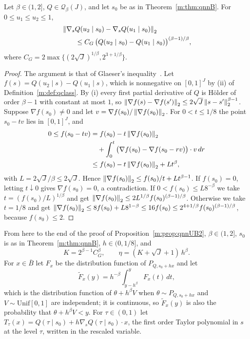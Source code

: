 \begin{lemma}\label{m:lem:glaeser}
Let $\beta\in(1,2]$, $Q\in\mathcal Q_\beta(J)$, and let $s_0$ be as in Theorem~\ref{m:thm:qnnB}. For $0\le u_1\le u_2\le1$,
\[
\begin{aligned}
&\left\|\nabla_sQ(u_2\mid s_0)-\nabla_sQ(u_1\mid s_0)\right\|_2\\
&\qquad\le C_G\,\big(Q(u_2\mid s_0)-Q(u_1\mid s_0)\big)^{(\beta-1)/\beta},
\end{aligned}
\]
where $C_G=2\max\{(2\sqrt J)^{1/\beta},2^{3+1/\beta}\}$.
\end{lemma}

\begin{proof}
The argument is that of Glaeser's inequality~\cite{glaeser1963}. Let $f(s)=Q(u_2\mid s)-Q(u_1\mid s)$, which is nonnegative on $[0,1]^J$ by (ii) of Definition~\ref{m:def:qclass}. By (i) every first partial derivative of $Q$ is H\"older of order $\beta-1$ with constant at most $1$, so $\left\|\nabla f(s)-\nabla f(s')\right\|_2\le2\sqrt J\left\|s-s'\right\|_2^{\beta-1}$. Suppose $\nabla f(s_0)\ne0$ and let $v=\nabla f(s_0)/\left\|\nabla f(s_0)\right\|_2$. For $0<t\le1/8$ the point $s_0-tv$ lies in $[0,1]^J$, and
\[
\begin{aligned}
0\le f(s_0-tv)&=f(s_0)-t\left\|\nabla f(s_0)\right\|_2\\
&\quad+\int_0^t\big(\nabla f(s_0)-\nabla f(s_0-rv)\big)\cdot v\,dr\\
&\le f(s_0)-t\left\|\nabla f(s_0)\right\|_2+Lt^\beta,
\end{aligned}
\]
with $L=2\sqrt J/\beta\le2\sqrt J$. Hence $\left\|\nabla f(s_0)\right\|_2\le f(s_0)/t+Lt^{\beta-1}$. If $f(s_0)=0$, letting $t\downarrow0$ gives $\nabla f(s_0)=0$, a contradiction. If $0<f(s_0)\le L8^{-\beta}$ we take $t=(f(s_0)/L)^{1/\beta}$ and get $\left\|\nabla f(s_0)\right\|_2\le2L^{1/\beta}f(s_0)^{(\beta-1)/\beta}$. Otherwise we take $t=1/8$ and get $\left\|\nabla f(s_0)\right\|_2\le8f(s_0)+L8^{1-\beta}\le16f(s_0)\le2^{4+1/\beta}f(s_0)^{(\beta-1)/\beta}$, because $f(s_0)\le2$.
\end{proof}

From here to the end of the proof of Proposition~\ref{m:prop:qnnUB2}, $\beta\in(1,2]$, $s_0$ is as in Theorem~\ref{m:thm:qnnB}, $h\in(0,1/8]$, and
\[
K=2^{\beta-1}C_G^\beta,\qquad\eta=(K+\sqrt J+1)\,h^\beta .
\]
For $x\in\bar B$ let $F_x$ be the distribution function of $P_{Q,s_0+hx}$ and let
\[
\tilde F_x(y)=h^{-\beta}\int_{y-h^\beta}^{y}F_x(t)\,dt ,
\]
which is the distribution function of $\theta+h^\beta V$ when $\theta\sim P_{Q,s_0+hx}$ and $V\sim\mathrm{Unif}[0,1]$ are independent; it is continuous, so $\tilde F_x(y)$ is also the probability that $\theta+h^\beta V<y$. For $\tau\in(0,1)$ let $T_\tau(x)=Q(\tau\mid s_0)+h\nabla_sQ(\tau\mid s_0)\cdot x$, the first order Taylor polynomial in $s$ at the level $\tau$, written in the rescaled variable.

